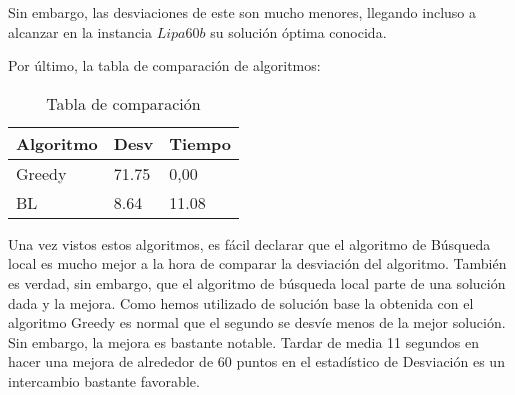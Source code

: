 Sin embargo, las desviaciones de este son mucho menores, llegando incluso a alcanzar en la instancia $Lipa60b$ su solución óptima conocida. 


\newpage
Por último, la tabla de comparación de algoritmos:

\begin{table}[htbp]
	\begin{center}
		\begin{tabular}{|l|l|l|}
			\hline
			Algoritmo &  Desv & Tiempo\\
			\hline \hline
			Greedy& 71.75 & 0,00\\ \hline
			BL& 8.64& 11.08\\ \hline
			
		\end{tabular}
		\caption{Tabla de comparación}
		\label{tabla:TablaComparacion}
	\end{center}
\end{table}

Una vez vistos estos algoritmos, es fácil declarar que el algoritmo de Búsqueda local es mucho mejor a la hora de comparar la desviación del algoritmo. También es verdad, sin embargo, que el algoritmo de búsqueda local parte de una solución dada y la mejora. Como hemos utilizado de solución base la obtenida con el algoritmo Greedy es normal que el segundo se desvíe menos de la mejor solución. Sin embargo, la mejora es bastante notable. Tardar de media 11 segundos en hacer una mejora de alrededor de 60 puntos en el estadístico de Desviación es un intercambio bastante favorable.








